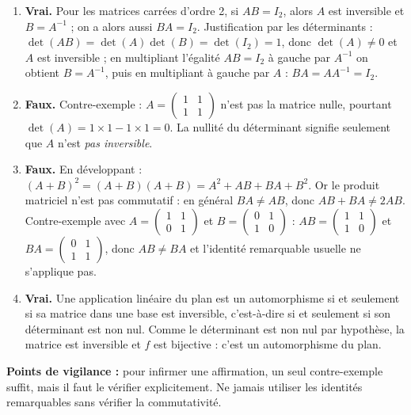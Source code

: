 \documentclass[11pt]{article}
\begin{document}
\begin{corrige}
\begin{enumerate}
\item \textbf{Vrai.} Pour les matrices carrées d'ordre 2, si $AB=I_2$, alors $A$ est inversible et $B=A^{-1}$ ; on a alors aussi $BA=I_2$. Justification par les déterminants : $\det(AB)=\det(A)\det(B)=\det(I_2)=1$, donc $\det(A)\neq0$ et $A$ est inversible ; en multipliant l'égalité $AB=I_2$ à gauche par $A^{-1}$ on obtient $B=A^{-1}$, puis en multipliant à gauche par $A$ : $BA=AA^{-1}=I_2$.

\item \textbf{Faux.} Contre-exemple : $A=\begin{pmatrix} 1 & 1 \\ 1 & 1 \end{pmatrix}$ n'est pas la matrice nulle, pourtant $\det(A)=1\times1-1\times1=0$. La nullité du déterminant signifie seulement que $A$ n'est \emph{pas inversible}.

\item \textbf{Faux.} En développant : $(A+B)^2=(A+B)(A+B)=A^2+AB+BA+B^2$. Or le produit matriciel n'est pas commutatif : en général $BA\neq AB$, donc $AB+BA\neq 2AB$. Contre-exemple avec $A=\begin{pmatrix} 1 & 1 \\ 0 & 1 \end{pmatrix}$ et $B=\begin{pmatrix} 0 & 1 \\ 1 & 0 \end{pmatrix}$ : $AB=\begin{pmatrix} 1 & 1 \\ 1 & 0 \end{pmatrix}$ et $BA=\begin{pmatrix} 0 & 1 \\ 1 & 1 \end{pmatrix}$, donc $AB\neq BA$ et l'identité remarquable usuelle ne s'applique pas.

\item \textbf{Vrai.} Une application linéaire du plan est un automorphisme si et seulement si sa matrice dans une base est inversible, c'est-à-dire si et seulement si son déterminant est non nul. Comme le déterminant est non nul par hypothèse, la matrice est inversible et $f$ est bijective : c'est un automorphisme du plan.
\end{enumerate}
\textbf{Points de vigilance :} pour infirmer une affirmation, un seul contre-exemple suffit, mais il faut le vérifier explicitement. Ne jamais utiliser les identités remarquables sans vérifier la commutativité.
\end{corrige}
\end{document}
